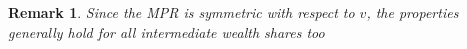 \documentclass[12pt]{article}
\newtheorem{proposition}{Proposition}
\newtheorem{remark}{Remark}
\begin{document}
%
\begin{remark}
Since the MPR is symmetric with respect to $v$, the properties generally hold for all intermediate wealth shares too
\end{remark}

%
%
%
\end{document}

